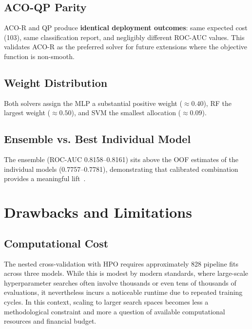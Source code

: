 \documentclass[12pt,a4paper]{article}
\begin{document}
\subsection{ACO-QP Parity}

ACO-R and QP produce \textbf{identical deployment outcomes}: same expected cost (103), same classification report, and negligibly different ROC-AUC values. This validates ACO-R as the preferred solver for future extensions where the objective function is non-smooth.

\subsection{Weight Distribution}

Both solvers assign the MLP a substantial positive weight ($\approx 0.40$), RF the largest weight ($\approx 0.50$), and SVM the smallest allocation ($\approx 0.09$).

\subsection{Ensemble vs. Best Individual Model}

The ensemble (ROC-AUC 0.8158--0.8161) sits above the OOF estimates of the individual models (0.7757--0.7781), demonstrating that calibrated combination provides a meaningful lift~\citep{dietterich2000ensemble}.

\pagebreak
\section{Drawbacks and Limitations}

\subsection{Computational Cost}

The nested cross-validation with HPO requires approximately 828 pipeline fits across three models. While this is modest by modern standards, where large-scale hyperparameter searches often involve thousands or even tens of thousands of evaluations, it nevertheless incurs a noticeable runtime due to repeated training cycles. In this context, scaling to larger search spaces becomes less a methodological constraint and more a question of available computational resources and financial budget.
\end{document}
